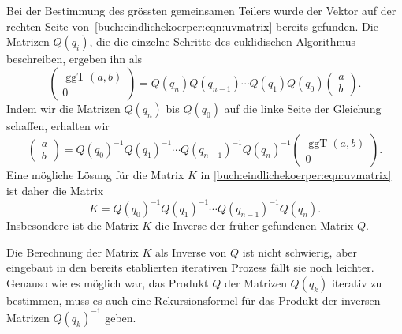 Bei der Bestimmung des grössten gemeinsamen Teilers wurde der Vektor auf
der rechten Seite von~\eqref{buch:eindlichekoerper:eqn:uvmatrix} bereits
gefunden.
Die Matrizen $Q(q_i)$, die die einzelne Schritte des euklidischen
Algorithmus beschreiben, ergeben ihn als
\[
\begin{pmatrix}
\operatorname{ggT}(a,b)\\0
\end{pmatrix}
=
Q(q_n)Q(q_{n-1}) \cdots Q(q_1)Q(q_0)
\begin{pmatrix}a\\b\end{pmatrix}.
\]
Indem wir die Matrizen $Q(q_n)$ bis $Q(q_0)$ auf die linke Seite der
Gleichung schaffen, erhalten wir
\[
\begin{pmatrix}a\\b\end{pmatrix}
=
Q(q_0)^{-1}
Q(q_1)^{-1}
\cdots
Q(q_{n-1})^{-1}
Q(q_n)^{-1}
\begin{pmatrix}\operatorname{ggT}(a,b)\\0\end{pmatrix}.
\]
Eine mögliche Lösung für die Matrix $K$ in
\eqref{buch:eindlichekoerper:eqn:uvmatrix}
ist daher die Matrix
\[
K
=
Q(q_0)^{-1}
Q(q_1)^{-1}
\cdots
Q(q_{n-1})^{-1}
Q(q_n).
\]
Insbesondere ist die Matrix $K$ die Inverse der früher gefundenen
Matrix $Q$.

Die Berechnung der Matrix $K$ als Inverse von $Q$ ist nicht schwierig,
aber eingebaut in den bereits etablierten iterativen Prozess fällt
sie noch leichter.
Genauso wie es möglich war, das Produkt $Q$ der Matrizen
$Q(q_k)$ iterativ zu bestimmen, muss es auch eine Rekursionsformel
für das Produkt der inversen Matrizen $Q(q_k)^{-1}$ geben.

